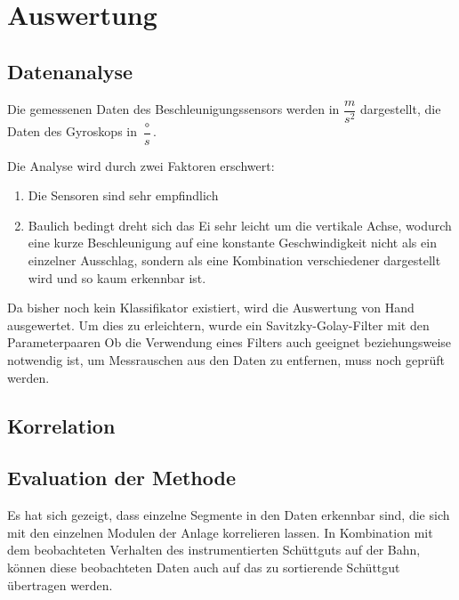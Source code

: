 \section{Auswertung}
\subsection{Datenanalyse}
Die gemessenen Daten des Beschleunigungssensors werden in $\dfrac{m}{s^{2}}$ 
dargestellt, die Daten des Gyroskops in $\dfrac{\circ}{s}$.

Die Analyse wird durch zwei Faktoren erschwert:
\begin{enumerate}
	\item Die Sensoren sind sehr empfindlich
	\item Baulich bedingt dreht sich das Ei sehr leicht um die vertikale Achse, wodurch eine kurze Beschleunigung auf eine konstante Geschwindigkeit nicht als ein einzelner Ausschlag, sondern als eine Kombination verschiedener dargestellt wird und so kaum erkennbar ist.
\end{enumerate}

Da bisher noch kein Klassifikator existiert, wird die Auswertung von Hand ausgewertet. Um dies zu erleichtern, wurde ein Savitzky-Golay-Filter mit den Parameterpaaren %
Ob die Verwendung eines Filters auch geeignet beziehungsweise notwendig ist, um Messrauschen aus den Daten zu entfernen, muss noch geprüft werden.


\subsection{Korrelation}


\subsection{Evaluation der Methode}

Es hat sich gezeigt, dass einzelne Segmente in den Daten erkennbar sind, die sich mit den einzelnen Modulen der Anlage korrelieren lassen. In Kombination mit dem beobachteten Verhalten des instrumentierten Schüttguts auf der Bahn, können diese beobachteten Daten auch auf das zu sortierende Schüttgut übertragen werden.
 
